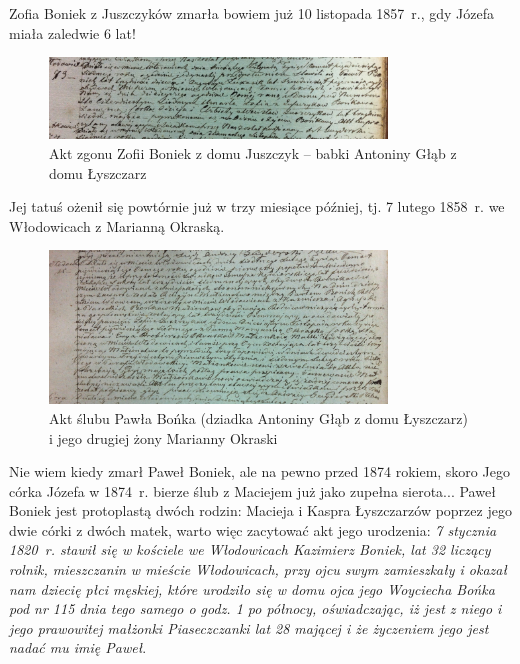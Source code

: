 Zofia Boniek z Juszczyków zmarła bowiem już 10 listopada 1857~r., gdy Józefa miała zaledwie 6 lat!

\begin{figure}[!h]
\begin{center}
\includegraphics[width=0.8\textwidth]{zdjecia/akt_zgonu_zofii_boniek.jpg}
\caption[Akt zgonu Zofii Boniek]{Akt zgonu Zofii Boniek z domu Juszczyk -- babki Antoniny Głąb z domu Łyszczarz}
\label{rys:akt_zgonu_zofii_boniek.jpg}
\end{center}
\end{figure}

Jej tatuś ożenił się powtórnie już w trzy miesiące później, tj. 7 lutego 1858~r. we Włodowicach z Marianną Okraską. 


\begin{figure}[!h]
\begin{center}
\includegraphics[width=0.8\textwidth]{zdjecia/akt_slubu_pawla_bonka_i_marianny_okraski.jpg}
\caption[Akt ślubu Pawła Bońka z Marianną Okraską]{Akt ślubu Pawła Bońka (dziadka Antoniny Głąb z domu Łyszczarz) i jego drugiej żony Marianny Okraski}
\label{rys:akt_slubu_pawla_bonka_i_marianny_okraski}
\end{center}
\end{figure}

Nie wiem kiedy zmarł Paweł Boniek, ale na pewno przed 1874 rokiem, skoro Jego córka Józefa w 1874~r. bierze ślub z Maciejem już jako zupełna sierota...
Paweł Boniek jest protoplastą dwóch rodzin: Macieja i Kaspra Łyszczarzów poprzez jego dwie córki z dwóch matek, warto więc zacytować akt jego urodzenia: \textit{7 stycznia 1820~r. stawił się w kościele we Włodowicach Kazimierz Boniek, lat 32 liczący rolnik, mieszczanin w mieście Włodowicach, przy ojcu swym zamieszkały i okazał nam dziecię płci męskiej, które urodziło się w domu ojca jego Woyciecha Bońka pod  nr 115 dnia tego samego o godz. 1 po północy, oświadczając, iż jest z niego i jego prawowitej małżonki  Piaseczczanki lat 28 mającej i że życzeniem jego jest nadać mu imię Paweł}.


